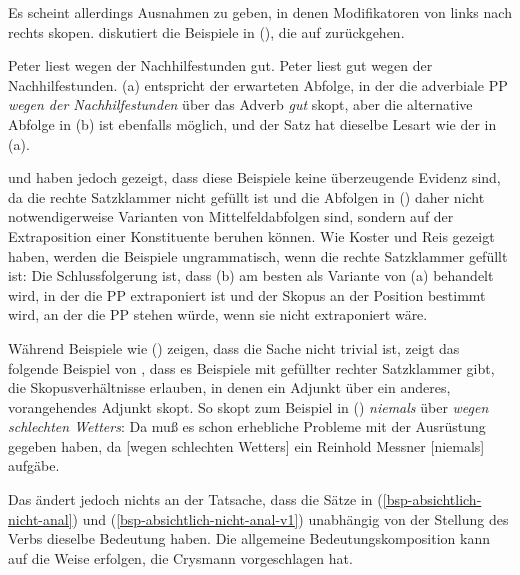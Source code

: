 \noindent
Es scheint allerdings Ausnahmen zu geben, in denen Modifikatoren von
links nach rechts skopen. \citet*[]{Kasper94a} diskutiert die Beispiele in (), die auf
\citet*[]{BV72} zurückgehen.

\eal
\label{bsp-peter-liest-gut-wegen}
\ex 
Peter liest wegen der Nachhilfestunden gut.
\ex 
Peter liest gut wegen der Nachhilfestunden.
\zl
(a) entspricht der erwarteten Abfolge, in der die adverbiale PP \emph{wegen der
  Nachhilfestunden} über das Adverb \emph{gut} skopt, aber die alternative Abfolge in (b) ist
ebenfalls möglich, und der Satz hat dieselbe Lesart wie der in (a).

  \citet[Abschnitt~6]{Koster75a} und \citet*[]{Reis80a} haben jedoch gezeigt, dass diese Beispiele
  keine überzeugende Evidenz sind, da die rechte Satzklammer nicht gefüllt ist und die
  Abfolgen in () daher nicht notwendigerweise Varianten von Mittelfeldabfolgen sind, sondern auf der Extraposition
  einer Konstituente beruhen können. Wie Koster und Reis gezeigt haben, werden die Beispiele ungrammatisch, wenn die rechte
  Satzklammer gefüllt ist:
\eal
{}
\zl
Die Schlussfolgerung ist, dass (b) am besten als Variante von (a) behandelt wird, in der die PP
extraponiert ist und der Skopus an der Position bestimmt wird, an der die PP stehen würde, wenn sie nicht extraponiert wäre.

Während Beispiele wie () zeigen, dass die Sache nicht trivial ist, zeigt das folgende Beispiel von \citet[]{Crysmann2004a}, dass es Beispiele mit gefüllter rechter Satzklammer gibt, die
Skopusverhältnisse erlauben, in denen ein Adjunkt über ein anderes, vorangehendes Adjunkt skopt. So skopt zum Beispiel in
() \emph{niemals} über \emph{wegen schlechten Wetters}:
\ea
 Da muß es schon erhebliche Probleme mit der Ausrüstung gegeben haben, da [wegen
  schlechten  Wetters] ein Reinhold Messner [niemals] aufgäbe.
\z

\noindent
Das ändert jedoch nichts an der Tatsache, dass die Sätze in (\ref{bsp-absichtlich-nicht-anal}) und
(\ref{bsp-absichtlich-nicht-anal-v1}) unabhängig von der Stellung des Verbs dieselbe Bedeutung haben. Die allgemeine
Bedeutungskomposition kann auf die Weise erfolgen, die Crysmann vorgeschlagen hat.%
%

